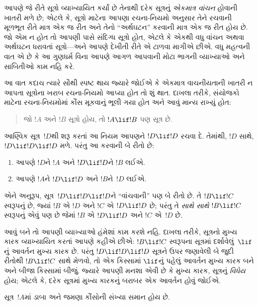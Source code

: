 \begin{explain}
આપણે જે રીતે સૂત્રો વ્યાખ્યાયિત કર્યાં છે તેનાથી દરેક
સૂત્રનું \emph{એકમાત્ર વાંચન} હોવાની ખાતરી મળે છે; એટલે કે,
સૂત્રો માટેના આપણા રચના-નિયમો અનુસાર તેને રચવાની મૂળભૂત રીતે
માત્ર એક જ રીત અને તેનો ``અર્થઘટન'' કરવાની માત્ર એક જ રીત હોય છે. જો
એમ ન હોત તો આપણી પાસે સંદિગ્ધ સૂત્રો હોત, એટલે કે એકથી વધુ
વાંચન અથવા અર્થઘટન ધરાવતાં સૂત્રો---અને આપણે દેખીતી રીતે એ
ટાળવા માગીએ છીએ. વધુ મહત્વની વાત એ છે કે આ ગુણધર્મ વિના આપણે આગળ
આપવાની મોટા ભાગની વ્યાખ્યાઓ અને સાબિતીઓ કામ નહિ કરે.

આ વાત કદાચ ત્યારે સૌથી સ્પષ્ટ થાય જ્યારે જોઈએ કે એકમાત્ર વાચનીયતાની
ખાતરી ન આપતા સૂત્રોના ખરાબ રચના-નિયમો આપ્યા હોત તો શું થાત.
દાખલા તરીકે, સંયોજકો માટેના રચના-નિયમોમાં કૌંસ મૂકવાનું ભૂલી ગયા હોત
અને આવું માન્ય રાખ્યું હોત:
\begin{quote}
જો $!A$ અને $!B$ સૂત્રો હોય, તો $!A \lif !B$ પણ સૂત્ર છે.
\end{quote}
આણ્વિક સૂત્ર~$!D$થી શરૂ કરતાં આ નિયમ આપણને $!D\lif !D$ રચવા દે.
તેમાંથી, $!D$ સાથે, $!D\lif !D\lif !D$ મળે. પરંતુ આ કરવાની બે રીતો છે:
\begin{enumerate}
\item આપણે $!D$ને $!A$ અને $!D\lif !D$ને $!B$ લઈએ.
\item આપણે $!A$ને $!D\lif !D$ અને $!B$ને~$!D$ લઈએ.
\end{enumerate}
એને અનુરૂપ, સૂત્ર~$!D\lif !D\lif !D$ને ``વાંચવાની'' પણ બે રીતો
છે. તે $!B\lif !C$ સ્વરૂપનું છે, જ્યાં $!B$ એ $!D$ અને $!C$ એ
$!D\lif !D$ છે; પરંતુ તે \emph{સાથે સાથે} $!B\lif !C$ સ્વરૂપનું એવું
પણ છે જેમાં $!B$ એ $!D\lif !D$ અને $!C$ એ~$!D$ છે.

આવું બને તો આપણી વ્યાખ્યાઓ હંમેશાં કામ કરશે નહિ. દાખલા તરીકે,
સૂત્રનો મુખ્ય કારક વ્યાખ્યાયિત કરતાં આપણે કહીએ છીએ:
$!B\lif !C$ સ્વરૂપના સૂત્રમાં દર્શાવેલું~$\lif$નું આવર્તન
મુખ્ય કારક છે. પરંતુ $!D\lif !D\lif !D$ સૂત્રને ઉપર જણાવેલી બે
જુદી રીતોથી $!B\lif !C$ સાથે મેળવો, તો એક કિસ્સામાં $\lif$નું પહેલું
આવર્તન મુખ્ય કારક બને અને બીજા કિસ્સામાં બીજું. જ્યારે આપણી
મનશા એવી છે કે મુખ્ય કારક, સૂત્રનું \emph{વિધેય}
હોય; એટલે કે, દરેક સૂત્રમાં મુખ્ય કારકનું બરાબર એક
આવર્તન હોવું જોઈએ.
\end{explain}

\begin{lem}
સૂત્ર~$!A$માં ડાબા અને જમણા કૌંસોની સંખ્યા સમાન હોય છે.
\end{lem}

